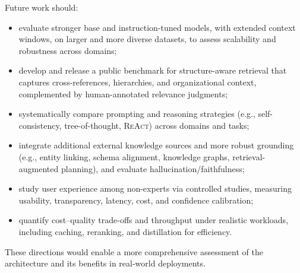 Future work should:
\begin{itemize}
	\item evaluate stronger base and instruction-tuned models, with extended context windows, on larger and more diverse datasets, to assess scalability and robustness across domains;
	\item develop and release a public benchmark for structure-aware retrieval that captures cross-references, hierarchies, and organizational context, complemented by human-annotated relevance judgments;
	\item systematically compare prompting and reasoning strategies (e.g., self-consistency, tree-of-thought, \textsc{ReAct}) across domains and tasks;
	\item integrate additional external knowledge sources and more robust grounding (e.g., entity linking, schema alignment, knowledge graphs, retrieval-augmented planning), and evaluate hallucination/faithfulness;
	\item study user experience among non-experts via controlled studies, measuring usability, transparency, latency, cost, and confidence calibration;
	\item quantify cost–quality trade-offs and throughput under realistic workloads, including caching, reranking, and distillation for efficiency.
\end{itemize}

These directions would enable a more comprehensive assessment of the architecture and its benefits in real-world deployments.



